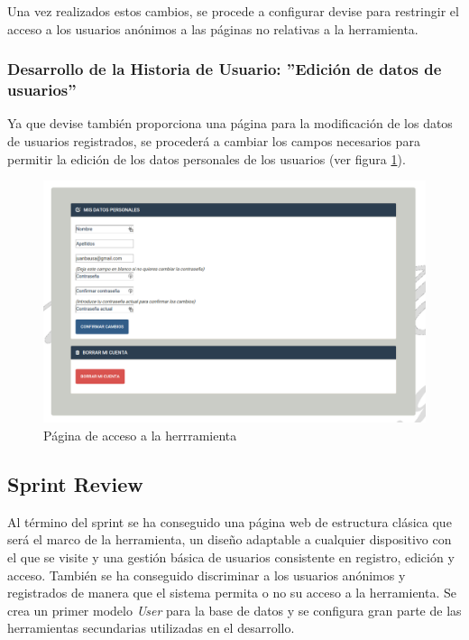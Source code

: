 	Una vez realizados estos cambios, se procede a configurar devise para restringir el acceso a los usuarios anónimos a las páginas no relativas a la herramienta.
		
	\subsubsection{Desarrollo de la Historia de Usuario: ''Edición de datos de usuarios'' }
	Ya que devise también proporciona una página para la modificación de los datos de usuarios registrados, se procederá a cambiar los campos necesarios para permitir la edición de los datos personales de los usuarios (ver figura \ref{fig:edicion_usuarios}).
	
	\begin{figure}[H]
		\centering
		\includegraphics[width=15cm, fbox={\fboxrule} 4mm]{images/05-resultados/12-edicion_usuarios.png}
		\caption{Página de acceso a la herrramienta}
		\label{fig:edicion_usuarios}
	\end{figure}
	
	\subsection{Sprint Review}
	Al término del sprint se ha conseguido una página web de estructura clásica que será el marco de la herramienta, un diseño adaptable a cualquier dispositivo con el que se visite y una gestión básica de usuarios consistente en registro, edición y acceso. También se ha conseguido discriminar a los usuarios anónimos y registrados de manera que el sistema permita o no su acceso a la herramienta. Se crea un primer modelo \textit{User} para la base de datos y se configura gran parte de las herramientas secundarias utilizadas en el desarrollo.

